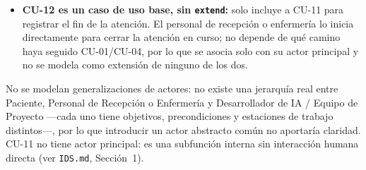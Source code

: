 \begin{itemize}
    manual y offline (\texttt{train\_lstm.py}) sobre el conjunto acumulado
    de muestras, no como una invocación síncrona disparada por cada
    captura individual. La relación entre ambos se documenta como
    precondición en el Modelo de Casos de Uso (Entregable de Modelos de
    Casos de Uso), no como flecha de inclusión.
    \item \textbf{CU-12 es un caso de uso base, sin \texttt{extend}:} solo
    incluye a CU-11 para registrar el fin de la atención. El personal de
    recepción o enfermería lo inicia
    directamente para cerrar la atención en curso; no depende de qué camino
    haya seguido CU-01/CU-04, por lo que se asocia solo con su actor
    principal y no se modela como extensión de ninguno de los dos.
\end{itemize}

No se modelan generalizaciones de actores: no existe una jerarquía real
entre Paciente, Personal de Recepción o Enfermería y Desarrollador de IA /
Equipo de Proyecto —cada uno tiene objetivos, precondiciones y estaciones de
trabajo distintos—, por lo que introducir un actor abstracto común no
aportaría claridad. CU-11 no tiene actor principal: es una subfunción
interna sin interacción humana directa
(ver \texttt{IDS.md}, Sección~1).
